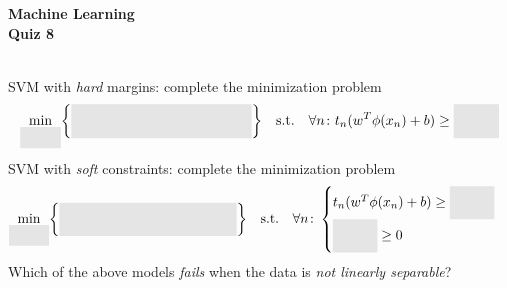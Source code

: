\documentclass[11pt,noanswers,addpoints]{exam}
\begin{document}
{\Large{\textbf{Machine Learning}}} \\[2mm]
\textbf{\Huge{Quiz 8}}\\



\hfill\hfill{}\\

\begin{questions}
\question[2] SVM with \emph{hard} margins: complete the minimization problem 
$$\min_{\colorbox{light-gray}{\phantom{w,b,$\xi$}}} \biggr\{\colorbox{light-gray}{\phantom{$\Big \vert$\qquad\qquad\qquad\qquad\qquad\qquad}} \biggr\}\quad \text{s.t.}\quad \forall n\colon t_n(w^T\phi(x_n)+b) \geq \colorbox{light-gray}{\phantom{$\Big \vert$w,b,$\xi$}} $$
\question[2] SVM with \emph{soft} constraints: complete the minimization problem 
$$\min_{\colorbox{light-gray}{\phantom{w,b,$\xi$}}} \biggr\{\colorbox{light-gray}{\phantom{$\Big \vert$\qquad\qquad\qquad\qquad\qquad\qquad}} \biggr\}\quad \text{s.t.}\quad\forall n\colon
\begin{cases}t_n(w^T\phi(x_n)+b) \geq \colorbox{light-gray}{\phantom{$\Big \vert$w,b,$\xi$}}\\ \colorbox{light-gray}{\phantom{$\Big \vert$w,b,$\xi$}}\geq 0\end{cases}$$
\question[1] Which of the above models \emph{fails} when the data is \emph{not linearly separable}?
\end{questions}
\end{document}
